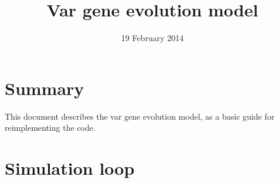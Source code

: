 \documentclass[11pt]{article}
\title{Var gene evolution model}
\date{19 February 2014}
\begin{document}
\maketitle

\section{Summary}

This document describes the var gene evolution model, as a basic guide for reimplementing the code.

\section{Simulation loop}
\end{document}
